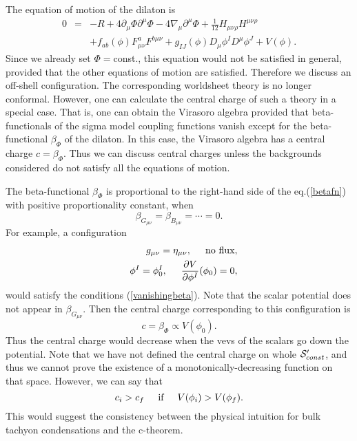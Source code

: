 \documentclass[a4paper,a4paper]{article}
\begin{document}
The equation of motion of the dilaton is 
\begin{eqnarray}
0 &=& -R+4\partial_\mu\Phi\partial^\mu\Phi-4\nabla_\mu\partial^\mu\Phi+\frac1{12}H_{\mu\nu\rho}H^{\mu\nu\rho}
        \nonumber \\
  & &+f_{ab}(\phi)F_{\mu\nu}^aF^{b\mu\nu}+g_{IJ}(\phi)D_\mu\phi^ID^\mu\phi^J+V(\phi).
         \label{betafn}
\end{eqnarray}
Since we already set $\Phi=$const., this equation would not be satisfied in general, provided that the other 
equations of motion are satisfied. 
Therefore we discuss an off-shell configuration. 
The corresponding worldsheet theory is no longer conformal. 
However, one can calculate the central charge of such a theory in a special case. 
That is, one can obtain the Virasoro algebra provided that beta-functionals 
of the sigma model coupling functions vanish except for the beta-functional $\beta_\Phi$ of the dilaton. 
In this case, the Virasoro algebra has a central charge $c=\beta_\Phi$. 
Thus we can discuss central charges unless the backgrounds considered do not satisfy all the equations of motion. 

The beta-functional $\beta_\Phi$ is proportional to the right-hand side of the eq.(\ref{betafn}) with positive 
proportionality constant, when 
\begin{equation}
\beta_{G_{\mu\nu}}=\beta_{B_{\mu\nu}}=\cdots=0.
   \label{vanishingbeta}
\end{equation}
For example, a configuration 
\begin{eqnarray}
&& g_{\mu\nu}=\eta_{\mu\nu}, \hspace{5mm} \mbox{no flux}, \nonumber \\ 
&& \phi^I=\phi^I_0, \hspace{5mm} \frac{\partial V}{\partial\phi^I}(\phi_0)=0, 
    \label{config}
\end{eqnarray}
would satisfy the conditions (\ref{vanishingbeta}). 
Note that the scalar potential does not appear in $\beta_{G_{\mu\nu}}$. 
Then the central charge corresponding to this configuration is 
\begin{equation}
c=\beta_\Phi\propto V(\phi_0). 
\end{equation}
Thus the central charge would decrease when the vevs of the scalars go down the potential. 
Note that we have not defined the central charge on whole ${\cal S}'_{const}$, and thus we cannot prove the 
existence of a 
monotonically-decreasing function on that space. 
However, we can say that 
\begin{equation}
c_i>c_f \hspace{5mm} \mbox{if} \hspace{5mm} V(\phi_i)>V(\phi_f). 
\end{equation}
This would suggest the consistency between the physical intuition for bulk tachyon condensations and the 
c-theorem. 
\end{document}
